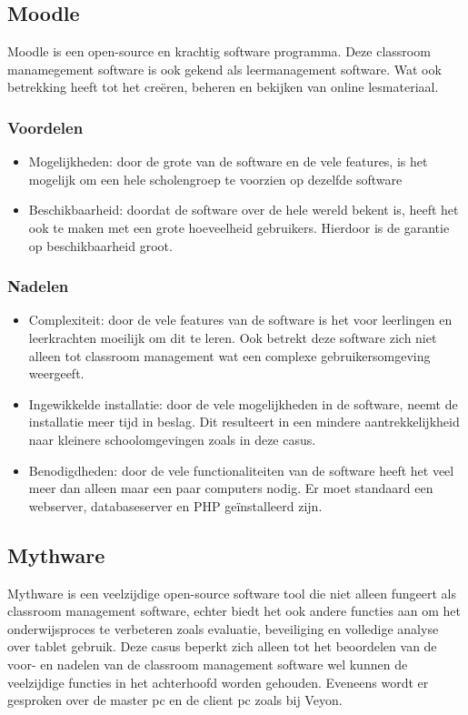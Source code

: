 \subsection{Moodle}
Moodle is een open-source en krachtig software programma. Deze classroom manamegement software is ook gekend als leermanagement software. Wat ook betrekking heeft tot het creëren, beheren en bekijken van online lesmateriaal. 
\subsubsection{Voordelen}
\begin{itemize}
    \item Mogelijkheden: door de grote van de software en de vele features, is het mogelijk om een hele scholengroep te voorzien op dezelfde software
    \item Beschikbaarheid: doordat de software over de hele wereld bekent is, heeft het ook te maken met een grote hoeveelheid gebruikers. Hierdoor is de garantie op beschikbaarheid groot.
\end{itemize}
\subsubsection{Nadelen}
\begin{itemize} 
    \item Complexiteit: door de vele features van de software is het voor leerlingen en leerkrachten moeilijk om dit te leren. Ook betrekt deze software zich niet alleen tot classroom management wat een complexe gebruikersomgeving weergeeft. 
    \item Ingewikkelde installatie: door de vele mogelijkheden in de software, neemt de installatie meer tijd in beslag. Dit resulteert in een mindere aantrekkelijkheid naar kleinere schoolomgevingen zoals in deze casus.
    \item Benodigdheden: door de vele functionaliteiten van de software heeft het veel meer dan alleen maar een paar computers nodig. Er moet standaard een webserver, databaseserver en PHP geïnstalleerd zijn. 
    \autocite{moodle}
\end{itemize} 
\subsection{Mythware}
Mythware is een veelzijdige open-source software tool die niet alleen fungeert als classroom management software, echter biedt het ook andere functies aan om het onderwijsproces te verbeteren zoals evaluatie, beveiliging en volledige analyse over tablet gebruik. Deze casus beperkt zich alleen tot het beoordelen van de voor- en nadelen van de classroom management software wel kunnen de veelzijdige functies in het achterhoofd worden gehouden. Eveneens wordt er gesproken over de master pc en de client pc zoals bij Veyon.
